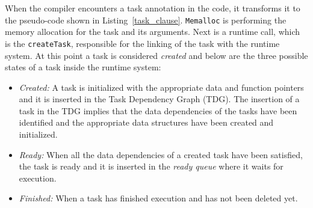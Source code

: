 When the compiler encounters a task annotation in the code, it transforms it to the pseudo-code shown in Listing~\ref{task_clause}.
\texttt{Memalloc} is performing the memory allocation for the task and its arguments.
Next is a runtime call, which is the \texttt{createTask}, responsible for the linking of the task with the runtime system.
At this point a task is considered \textit{created} and below are the three possible states of a task inside the runtime system:
\begin{itemize}
\item \textit{Created:} A task is initialized with the appropriate data and function pointers and it is inserted in the Task Dependency Graph (TDG). The insertion of a task in the TDG implies that the data dependencies of the tasks have been identified and the appropriate data structures have been created and initialized. 
\item \textit{Ready:} When all the data dependencies of a created task have been satisfied, the task is ready and it is inserted in the \textit{ready queue} where it waits for execution. 
\item \textit{Finished:} When a task has finished execution and has not been deleted yet.
\end{itemize}

